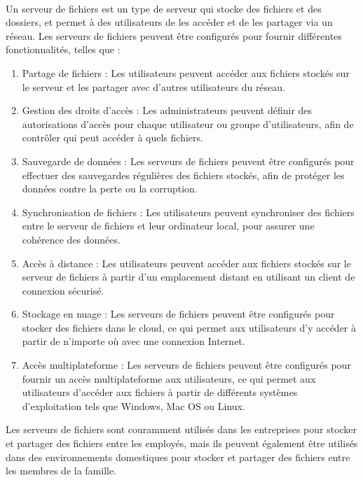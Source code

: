 \paragraph{ }
Un serveur de fichiers est un type de serveur qui stocke des fichiers et des dossiers, et permet à des utilisateurs de les accéder et de les partager via un réseau. Les serveurs de fichiers peuvent être configurés pour fournir différentes fonctionnalités, telles que :
\begin{enumerate}
 \item   Partage de fichiers : Les utilisateurs peuvent accéder aux fichiers stockés sur le serveur et les partager avec d'autres utilisateurs du réseau.
 
 \item Gestion des droits d'accès : Les administrateurs peuvent définir des autorisations d'accès pour chaque utilisateur ou groupe d'utilisateurs, afin de contrôler qui peut accéder à quels fichiers.
 
 \item Sauvegarde de données : Les serveurs de fichiers peuvent être configurés pour effectuer des sauvegardes régulières des fichiers stockés, afin de protéger les données contre la perte ou la corruption.
 
 \item Synchronisation de fichiers : Les utilisateurs peuvent synchroniser des fichiers entre le serveur de fichiers et leur ordinateur local, pour assurer une cohérence des données.
 
 \item Accès à distance : Les utilisateurs peuvent accéder aux fichiers stockés sur le serveur de fichiers à partir d'un emplacement distant en utilisant un client de connexion sécurisé.
 
  \item Stockage en nuage : Les serveurs de fichiers peuvent être configurés pour stocker des fichiers dans le cloud, ce qui permet aux utilisateurs d'y accéder à partir de n'importe où avec une connexion Internet.
 
\item Accès multiplateforme : Les serveurs de fichiers peuvent être configurés pour fournir un accès multiplateforme aux utilisateurs, ce qui permet aux utilisateurs d'accéder aux fichiers à partir de différents systèmes d'exploitation tels que Windows, Mac OS ou Linux.
 
\end{enumerate}
Les serveurs de fichiers sont couramment utilisés dans les entreprises pour stocker et partager des fichiers entre les employés, mais ils peuvent également être utilisés dans des environnements domestiques pour stocker et partager des fichiers entre les membres de la famille.
